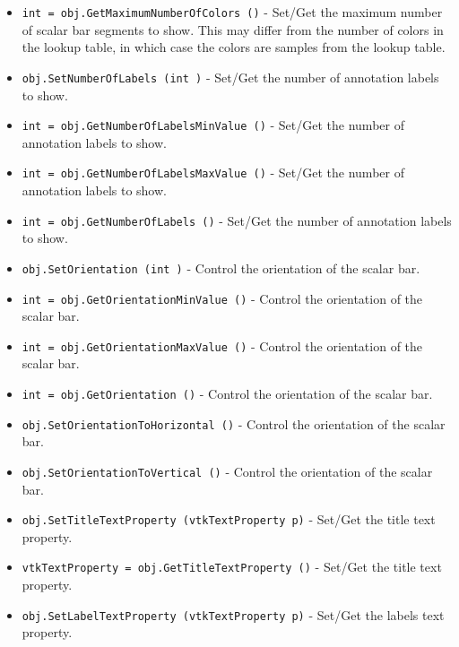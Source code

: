 \begin{itemize}
\item  \verb|int = obj.GetMaximumNumberOfColors ()| -  Set/Get the maximum number of scalar bar segments to show. This may
 differ from the number of colors in the lookup table, in which case
 the colors are samples from the lookup table.

\item  \verb|obj.SetNumberOfLabels (int )| -  Set/Get the number of annotation labels to show.

\item  \verb|int = obj.GetNumberOfLabelsMinValue ()| -  Set/Get the number of annotation labels to show.

\item  \verb|int = obj.GetNumberOfLabelsMaxValue ()| -  Set/Get the number of annotation labels to show.

\item  \verb|int = obj.GetNumberOfLabels ()| -  Set/Get the number of annotation labels to show.

\item  \verb|obj.SetOrientation (int )| -  Control the orientation of the scalar bar.

\item  \verb|int = obj.GetOrientationMinValue ()| -  Control the orientation of the scalar bar.

\item  \verb|int = obj.GetOrientationMaxValue ()| -  Control the orientation of the scalar bar.

\item  \verb|int = obj.GetOrientation ()| -  Control the orientation of the scalar bar.

\item  \verb|obj.SetOrientationToHorizontal ()| -  Control the orientation of the scalar bar.

\item  \verb|obj.SetOrientationToVertical ()| -  Control the orientation of the scalar bar.

\item  \verb|obj.SetTitleTextProperty (vtkTextProperty p)| -  Set/Get the title text property.

\item  \verb|vtkTextProperty = obj.GetTitleTextProperty ()| -  Set/Get the title text property.

\item  \verb|obj.SetLabelTextProperty (vtkTextProperty p)| -  Set/Get the labels text property.


\end{itemize}
